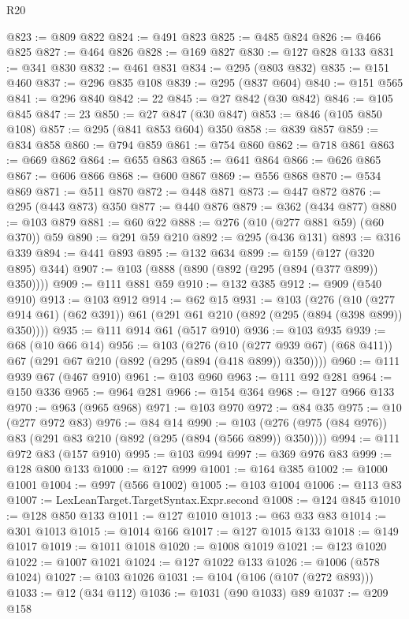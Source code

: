 \begin{lexlean}{R20}
\begin{coremodule}
{{{{{{{{{{{{{{{{{{{{{{{{{{{{{{{{{{{{{{{{{{{{{{{{{{{{{{{{{{{{{{{@823 := @809 @822
@824 := @491 @823
@825 := @485 @824
@826 := @466 @825
@827 := @464 @826
@828 := @169 @827
@830 := @127 @828 @133
@831 := @341 @830
@832 := @461 @831
@834 := @295 (@803 @832)
@835 := @151 @460
@837 := @296 @835 @108
@839 := @295 (@837 @604)
@840 := @151 @565
@841 := @296 @840
@842 := 22
@845 := @27 @842 (@30 @842)
@846 := @105 @845
@847 := 23
@850 := @27 @847 (@30 @847)
@853 := @846 (@105 @850 @108)
@857 := @295 (@841 @853 @604) @350
@858 := @839 @857
@859 := @834 @858
@860 := @794 @859
@861 := @754 @860
@862 := @718 @861
@863 := @669 @862
@864 := @655 @863
@865 := @641 @864
@866 := @626 @865
@867 := @606 @866
@868 := @600 @867
@869 := @556 @868
@870 := @534 @869
@871 := @511 @870
@872 := @448 @871
@873 := @447 @872
@876 := @295 (@443 @873) @350
@877 := @440 @876
@879 := @362 (@434 @877)
@880 := @103 @879
@881 := @60 @22
@888 := @276 (@10 (@277 @881 @59) (@60 @370)) @59
@890 := @291 @59 @210
@892 := @295 (@436 @131)
@893 := @316 @339
@894 := @441 @893
@895 := @132 @634
@899 := @159 (@127 (@320 @895) @344)
@907 := @103 (@888 (@890 (@892 (@295 (@894 (@377 @899)) @350))))
@909 := @111 @881 @59
@910 := @132 @385
@912 := @909 (@540 @910)
@913 := @103 @912
@914 := @62 @15
@931 := @103
    (@276
      (@10 (@277 @914 @61) (@62 @391))
      @61
      (@291 @61 @210 (@892 (@295 (@894 (@398 @899)) @350))))
@935 := @111 @914 @61 (@517 @910)
@936 := @103 @935
@939 := @68 (@10 @66 @14)
@956 := @103
    (@276
      (@10 (@277 @939 @67) (@68 @411))
      @67
      (@291 @67 @210 (@892 (@295 (@894 (@418 @899)) @350))))
@960 := @111 @939 @67 (@467 @910)
@961 := @103 @960
@963 := @111 @92 @281
@964 := @150 @336
@965 := @964 @281
@966 := @154 @364
@968 := @127 @966 @133
@970 := @963 (@965 @968)
@971 := @103 @970
@972 := @84 @35
@975 := @10 (@277 @972 @83)
@976 := @84 @14
@990 := @103 (@276 (@975 (@84 @976)) @83 (@291 @83 @210 (@892 (@295 (@894 (@566 @899)) @350))))
@994 := @111 @972 @83 (@157 @910)
@995 := @103 @994
@997 := @369 @976 @83
@999 := @128 @800 @133
@1000 := @127 @999
@1001 := @164 @385
@1002 := @1000 @1001
@1004 := @997 (@566 @1002)
@1005 := @103 @1004
@1006 := @113 @83
@1007 := LexLeanTarget.TargetSyntax.Expr.second
@1008 := @124 @845
@1010 := @128 @850 @133
@1011 := @127 @1010
@1013 := @63 @33 @83
@1014 := @301 @1013
@1015 := @1014 @166
@1017 := @127 @1015 @133
@1018 := @149 @1017
@1019 := @1011 @1018
@1020 := @1008 @1019
@1021 := @123 @1020
@1022 := @1007 @1021
@1024 := @127 @1022 @133
@1026 := @1006 (@578 @1024)
@1027 := @103 @1026
@1031 := @104 (@106 (@107 (@272 @893)))
@1033 := @12 (@34 @112)
@1036 := @1031 (@90 @1033) @89
@1037 := @209 @158
}}}}}}}}}}}}}}}}}}}}}}}}}}}}}}}}}}}}}}}}}}}}}}}}}}}}}}}}}}}}}}}
\end{coremodule}
\end{lexlean}
